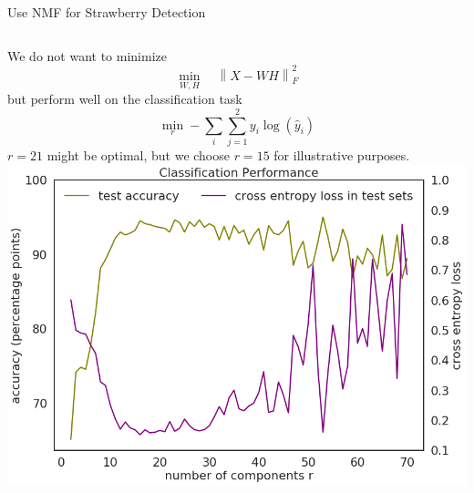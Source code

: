 \documentclass[aspectratio=169]{beamer}
\begin{document}
\begin{frame}{Use NMF for Strawberry Detection}

	\begin{columns}
			We do not want to minimize
			\begin{equation*}
			 \min_{ W, H }  \quad \left\lVert X - W H\right\rVert^2_F
			\end{equation*}
			but perform well on the classification task
			\begin{equation*}
			\min_{r}  - \sum_{i} \sum_{j =1}^{2}  y_i \log( \hat{y}_i) 
			\end{equation*}			
			$r=21$ might be optimal, but we choose $r=15$ for illustrative purposes.
			\includegraphics[width=\linewidth]{images/fruit_accuracies.png}
	\end{columns}
\end{frame}
\end{document}
